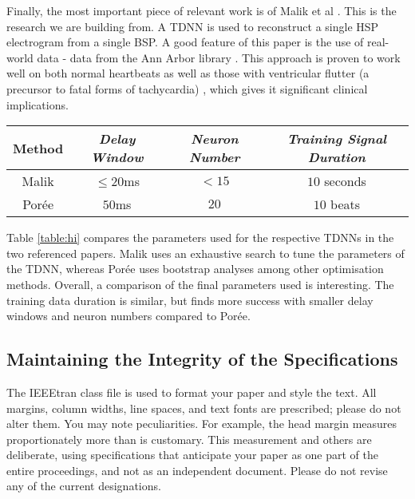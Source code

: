 \documentclass[10pt,a4paper,conference]{IEEEtran}
\begin{document}
Finally, the most important piece of relevant work is of Malik et al \cite{Malik2018}. This is the research we are building from. A TDNN is used to reconstruct a single HSP electrogram from a single BSP. A good feature of this paper is the use of real-world data - data from the Ann Arbor library \cite{AnnArbor}. This approach is proven to work well on both normal heartbeats as well as those with ventricular flutter (a precursor to fatal forms of tachycardia) \cite{Malik2018}, which gives it significant clinical implications.


\begin{table*}[t]
\centering
\caption{TDNN Parameter Comparison}
\label{table:hi}
\begin{tabular}{|c|c|c|c|}
\hline
\textbf{Method} & \textbf{\textit{Delay Window}}& \textbf{\textit{Neuron Number}}& \textbf{\textit{Training Signal Duration}} \\
\hline
Malik & $\leq20$ms & $<15$ & $10$ seconds  \\
\hline
Por\'ee & $50$ms & $20$ & $10$ beats  \\
\hline
\end{tabular}
\end{table*}



Table \ref{table:hi} compares the parameters used for the respective TDNNs in the two referenced papers. Malik uses an exhaustive search to tune the parameters of the TDNN, whereas Por\'ee uses bootstrap analyses among other optimisation methods. Overall, a comparison of the final parameters used is interesting. The training data duration is similar, but \cite{Malik2018} finds more success with smaller delay windows and neuron numbers compared to Por\'ee.


\subsection{Maintaining the Integrity of the Specifications}

The IEEEtran class file is used to format your paper and style the text. All margins, 
column widths, line spaces, and text fonts are prescribed; please do not 
alter them. You may note peculiarities. For example, the head margin
measures proportionately more than is customary. This measurement 
and others are deliberate, using specifications that anticipate your paper 
as one part of the entire proceedings, and not as an independent document. 
Please do not revise any of the current designations.
\end{document}
